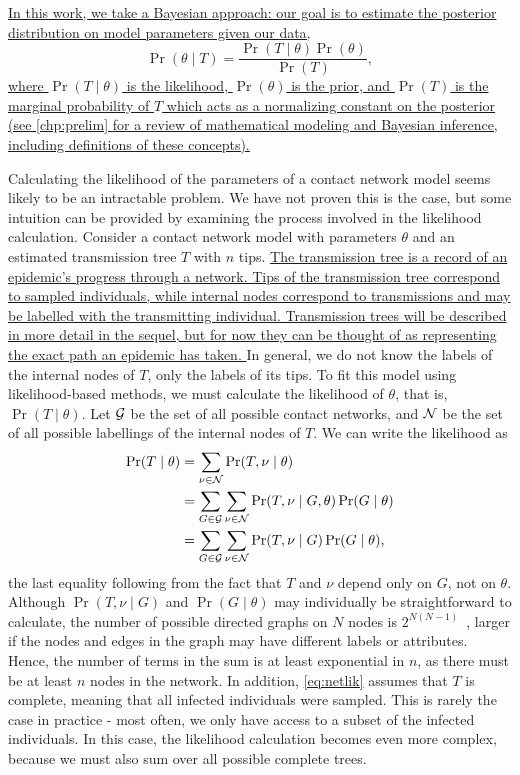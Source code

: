 {\color{blue}\uline{In this work, we take a Bayesian approach: our goal is to
estimate the posterior distribution on model parameters given our data,}
\[
    \Pr(\theta \mid T) = \frac{\Pr(T \mid \theta) \Pr(\theta)}{\Pr(T)},
\]
\uline{where $\Pr(T \mid \theta)$ is the likelihood, $\Pr(\theta)$ is the prior,
and $\Pr(T)$ is the marginal probability of $T$ which acts as a normalizing
constant on the posterior (see \cref{chp:prelim} \uline{for a review of
mathematical modeling and Bayesian inference, including definitions of these
concepts).
}}

Calculating the likelihood of the parameters of a contact network model seems
likely to be an intractable problem. We have not proven this is the case, but
some intuition can be provided by examining the process involved in the
likelihood calculation. Consider a contact network model with parameters
$\theta$ and an estimated transmission tree $T$ with $n$ tips.
{\color{blue}\uline{The transmission tree is a record of an epidemic's progress
through a network. Tips of the transmission tree correspond to sampled
individuals, while internal nodes correspond to transmissions and may be
labelled with the transmitting individual. Transmission trees will be described
in more detail in the sequel, but for now they can be thought of as
representing the exact path an epidemic has taken. }} In general, we do not
know the labels of the internal nodes of $T$, only the labels of its tips. To
fit this model using likelihood-based methods, we must calculate the likelihood
of $\theta$, that is, $\Pr(T \mid \theta)$. Let $\mathcal{G}$ be the set of all possible
contact networks, and $\mathcal{N}$ be the set of all possible labellings of the
internal nodes of $T$. We can write the likelihood as
\begin{align}
\begin{split}
  \label{eq:netlik}
  \Pr(T \mid \theta)
    &= \sum_{\nu \in \mathcal{N}} \Pr(T, \nu \mid \theta) \\
    &= \sum_{G \in \mathcal{G}} \sum_{\nu \in \mathcal{N}} \Pr(T, \nu \mid G, \theta) \Pr(G \mid \theta) \\
    &= \sum_{G \in \mathcal{G}} \sum_{\nu \in \mathcal{N}} \Pr(T, \nu \mid G) \Pr(G \mid \theta),
\end{split}
\end{align}
the last equality following from the fact that $T$ and $\nu$ depend only on
$G$, not on $\theta$. Although $\Pr(T, \nu \mid G)$ and $\Pr(G \mid \theta)$
may individually be straightforward to calculate, the number of possible
directed graphs on $N$ nodes is $2^{N(N-1)}$~\autocite{harary2014graphical},
larger if the nodes and edges in the graph may have different labels or
attributes. Hence, the number of terms in the sum is at least exponential in
$n$, as there must be at least $n$ nodes in the network. In addition,
\cref{eq:netlik} assumes that $T$ is complete, meaning that all infected
individuals were sampled. This is rarely the case in practice - most often, we
only have access to a subset of the infected individuals. In this case, the
likelihood calculation becomes even more complex, because we must also sum over
all possible complete trees.

}
